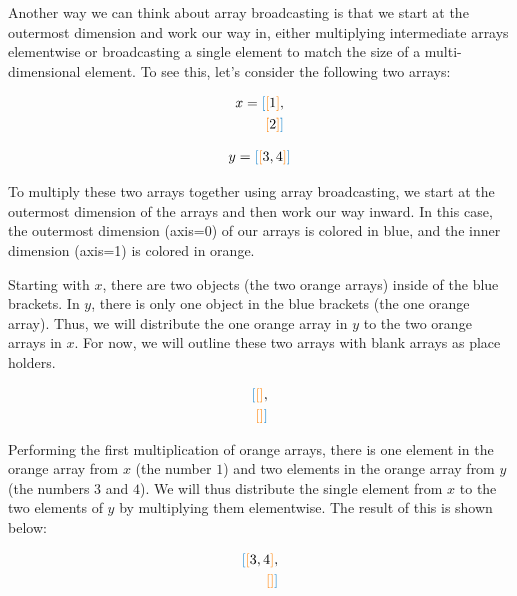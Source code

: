 Another way we can think about array broadcasting is that we start at the outermost dimension and work our way in, either multiplying intermediate arrays elementwise or broadcasting a single element to match the size of a multi-dimensional element.
To see this, let's consider the following two arrays:

\begin{align*}
x = \textcolor{blue}{[} \textcolor{orange}{[} 1 \textcolor{orange}{]}, \\
\textcolor{orange}{[} 2 \textcolor{orange}{]} \textcolor{blue}{]} \\
\end{align*}

\begin{align*}
 y = \textcolor{blue}{[} \textcolor{orange}{[} 3, 4 \textcolor{orange}{]} \textcolor{blue}{]}
\end{align*}

To multiply these two arrays together using array broadcasting, we start at the outermost dimension of the arrays and then work our way inward.
In this case, the outermost dimension (axis=0) of our arrays is colored in blue, and the inner dimension (axis=1) is colored in orange.

Starting with $x$, there are two objects (the two orange arrays) inside of the blue brackets.
In $y$, there is only one object in the blue brackets (the one orange array).
Thus, we will distribute the one orange array in $y$ to the two orange arrays in $x$. For now, we will outline these two arrays with blank arrays as place holders.

\begin{align*}
\textcolor{blue}{[} \textcolor{orange}{[} \textcolor{orange}{]}, \\
\textcolor{orange}{[} \textcolor{orange}{]} \textcolor{blue}{]}\\
\end{align*}

Performing the first multiplication of orange arrays, there is one element in the orange array from $x$ (the number $1$) and two elements in the orange array from $y$ (the numbers $3$ and $4$).
We will thus distribute the single element from $x$ to the two elements of $y$ by multiplying them elementwise.
The result of this is shown below:

\begin{align*}
\textcolor{blue}{[} \textcolor{orange}{[} 3, 4 \textcolor{orange}{]}, \\
\textcolor{orange}{[} \textcolor{orange}{]} \textcolor{blue}{]}\\
\end{align*}

